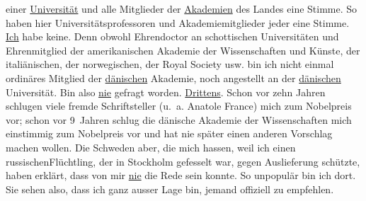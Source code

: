 \begin{ledgroupsized}[t]{13cm}
                    einer \uline{Universität} und alle Mitglieder der \uline{Akademien} des Landes eine Stimme. So haben hier
                    Universitätsprofessoren und Akademiemitglieder jeder eine Stimme.\pend
           \pstart
           \uline{Ich} habe keine. Denn obwohl Ehrendoctor an schottischen Universitäten und Ehrenmitglied
                    der amerikanischen Akademie der Wissenschaften und
                        Künste, der italiänischen, der norwegischen, der Royal Society usw.
                    bin ich nicht einmal ordinäres Mitglied der \uline{dänischen} Akademie, noch angestellt an
                    der \uline{dänischen} Universität.\pend
           \pstart
           Bin also \uline{nie} gefragt worden.\pend
           \pstart
           \uline{Drittens}. Schon vor zehn Jahren schlugen viele
                    fremde Schriftsteller (u. a. Anatole France)
                    mich zum Nobelpreis vor; schon vor 9 Jahren
                    schlug {\pb}die dänische Akademie der Wissenschaften mich einstimmig zum Nobelpreis vor und hat nie später einen anderen
                    Vorschlag machen wollen. Die Schweden aber,
                    die mich hassen, weil ich einen russischenFlüchtling, der in Stockholm gefesselt war, gegen Auslieferung
                    schützte, haben erklärt, dass von mir \uline{nie} die
                    Rede sein konnte. So unpopulär bin ich dort. Sie sehen also, dass ich ganz
                    ausser Lage bin, jemand offiziell zu empfehlen.\pend
           \pstart

\end{ledgroupsized}

